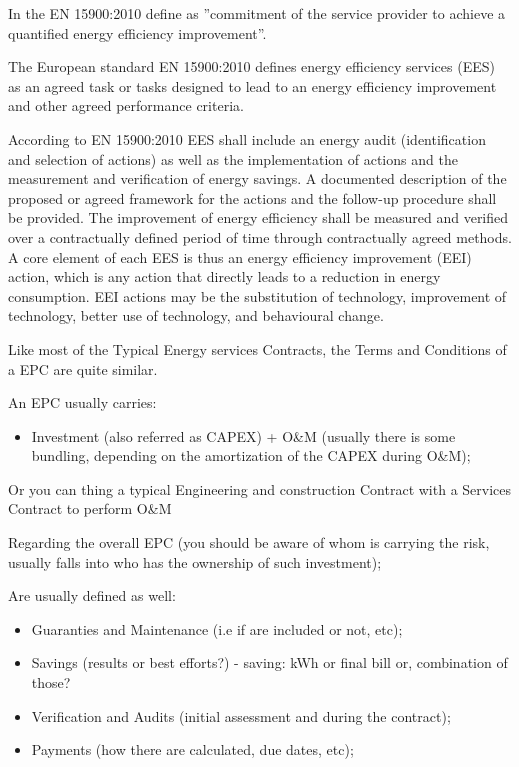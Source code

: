 \documentclass[]{book}
\providecommand{\tightlist}{%
  \setlength{\itemsep}{0pt}\setlength{\parskip}{0pt}}
\theoremstyle{definition}
\theoremstyle{definition}
\theoremstyle{definition}
\theoremstyle{remark}
\begin{document}
In the EN 15900:2010 define as ''commitment of the service provider to
achieve a quantified energy efficiency improvement''.

The European standard EN 15900:2010 defines energy efficiency services
(EES) as an agreed task or tasks designed to lead to an energy
efficiency improvement and other agreed performance criteria.

According to EN 15900:2010 EES shall include an energy audit
(identification and selection of actions) as well as the implementation
of actions and the measurement and verification of energy savings. A
documented description of the proposed or agreed framework for the
actions and the follow-up procedure shall be provided. The improvement
of energy efficiency shall be measured and verified over a contractually
defined period of time through contractually agreed methods. A core
element of each EES is thus an energy efficiency improvement (EEI)
action, which is any action that directly leads to a reduction in energy
consumption. EEI actions may be the substitution of technology,
improvement of technology, better use of technology, and behavioural
change.

Like most of the Typical Energy services Contracts, the Terms and
Conditions of a EPC are quite similar.

An EPC usually carries:

\begin{itemize}
\tightlist
\item
  Investment (also referred as CAPEX) + O\&M (usually there is some
  bundling, depending on the amortization of the CAPEX during O\&M);
\end{itemize}

Or you can thing a typical Engineering and construction Contract with a
Services Contract to perform O\&M

Regarding the overall EPC (you should be aware of whom is carrying the
risk, usually falls into who has the ownership of such investment);

Are usually defined as well:

\begin{itemize}
\item
  Guaranties and Maintenance (i.e if are included or not, etc);
\item
  Savings (results or best efforts?) - saving: kWh or final bill or,
  combination of those?
\item
  Verification and Audits (initial assessment and during the contract);
\item
  Payments (how there are calculated, due dates, etc);
\end{itemize}
\end{document}
